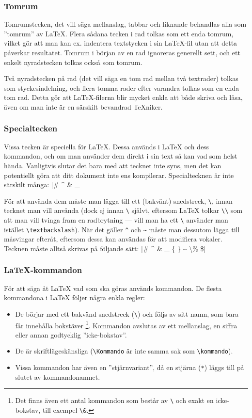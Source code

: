 \documentclass[draft,swe,10pt,nofont]{skrapport}
\makeatletter
\let\@oldLaTeX\LaTeX
\def\LaTeX{\texorpdfstring{\@oldLaTeX}{LaTeX}}
\newcommand\cmd[1]{\textenglish{\texttt{\textbackslash{}#1}}}%
\makeatother
\begin{document}
	\subsubsection{Tomrum}
	Tomrumstecken, det vill säga mellanslag, tabbar och liknande behandlas
	alla som ”tomrum” av \LaTeX{}. Flera sådana tecken i rad tolkas som ett
	enda tomrum, vilket gör att man kan ex. indentera textstycken i sin
	\LaTeX-fil utan att detta påverkar resultatet. Tomrum i början av en rad
	ignoreras generellt sett, och ett enkelt nyradstecken tolkas också som
	tomrum.
	
	Två nyradstecken på rad (det vill säga en tom rad mellan två textrader) tolkas som
	styckesindelning, och flera tomma rader efter varandra tolkas som en enda
	tom rad. Detta gör att \LaTeX{}-filerna blir mycket enkla att både skriva
	och läsa, även om man inte är en särskilt bevandrad \TeX{}niker.
	
	\subsubsection{Specialtecken}
	Vissa tecken är speciella för \LaTeX{}. Dessa används i \LaTeX{} och dess
	kommandon, och om man använder dem direkt i sin text så kan vad som helst
	hända. Vanligtvis slutar det bara med att tecknet inte syns, men det kan
	potentiellt göra att ditt dokument inte ens kompilerar. Specialtecknen
	är inte särskilt många:
	\latex|# ^ & _ { } ~ \ %
	
	För att använda dem måste man lägga till ett (bakvänt) snedstreck,
	\cmd{}, innan tecknet man vill använda (dock ej innan
	\cmd{} självt, eftersom \LaTeX{} tolkar
	\cmd{\textbackslash} som att man vill tvinga fram en
	radbrytning — vill man ha ett \cmd{} använder man istället
	\cmd{textbackslash}).
	När det gäller \verb|^| och \verb|~| måste man
	dessutom lägga till måsvingar efteråt, eftersom dessa kan användas för att
	modifiera vokaler. Tecknen måste alltså skrivas på följande sätt:
	\latex|\# \^{} \& \_ \{ \} \~{} \textbackslash \% \$|
	
	\subsubsection{\LaTeX-kommandon}
	För att säga åt \LaTeX{} vad som ska göras används kommandon. De flesta
	kommandona i \LaTeX{} följer några enkla regler:
	\begin{itemize}
		\item De börjar med ett bakvänd snedstreck (\cmd{}) och följs av sitt
		namn, som bara får innehålla bokstäver%
		\footnote{Det finns även ett antal kommandon som består av \cmd{} och
		exakt en icke-bokstav, till exempel \cmd{\&}.}.
		Kommandon avslutas av ett
		mellanslag, en siffra eller annan godtycklig ”icke-bokstav”.
		
		\item De är skriftlägeskänsliga (\cmd{Kommando} är inte samma sak som
		\cmd{kommando}).
		
		\item Vissa kommandon har även en ”stjärnvariant”, då en stjärna
		(\texttt{*}) läggs till på slutet av kommandonamnet.
	\end{itemize}
	
\end{document}
